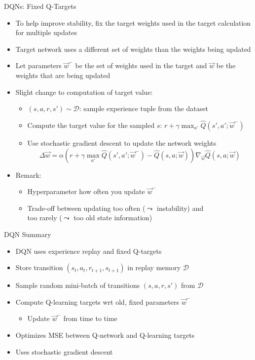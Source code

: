 \begin{frame}[c]{DQNs: Fixed Q-Targets}
	
	\begin{itemize}
		\item To help improve stability, fix the \alert{target weights} used in the target calculation for multiple updates
		\item Target network uses a different set of weights than the weights being updated
		\item Let parameters $\vec{w}^-$ be the set of weights used in the target and $\vec{w}$ be the weights that are being updated
		\item Slight change to computation of target value:
		\begin{itemize}
			\item $(s,a,r,s')\sim \mathcal{D}$: sample experience tuple from the dataset
			\item Compute the target value for the sampled $s$: $r+\gamma \max_{a'} \hat{Q}(s',a';\vec{w}^-)$
			\item Use stochastic gradient descent to update the network weights
			$$\Delta \vec{w} = \alpha (r + \gamma \max_{a'} \hat{Q}(s',a';\vec{w}^-) - \hat{Q}(s,a;\vec{w})) \nabla_{\vec{w}}\hat{Q}(s,a;\vec{w})$$
		\end{itemize}
		\smallskip 
		\pause
		\item Remark:
		\begin{itemize}
			\item Hyperparameter how often you update $\vec{w}^-$
			\item Trade-off between updating too often ($\leadsto$ instability) and\\ too rarely ($\leadsto$ too old state information)
		\end{itemize}
	\end{itemize}
	
\end{frame}
\begin{frame}[c]{DQN Summary}
	
	\begin{itemize}
		\item DQN uses experience replay and fixed Q-targets
		\item Store transition $(s_t, a_t, r_{t+1}, s_{t+1})$ in replay memory $\mathcal{D}$
		\item Sample random mini-batch of transitions $(s,a,r,s')$ from $\mathcal{D}$
		\item Compute Q-learning targets wrt old, fixed parameters $\vec{w}^-$
		\begin{itemize}
			\item Update $\vec{w}^-$ from time to time
		\end{itemize}
		\item Optimizes MSE between Q-network and Q-learning targets
		\item Uses stochastic gradient descent
	\end{itemize}
	
\end{frame}

